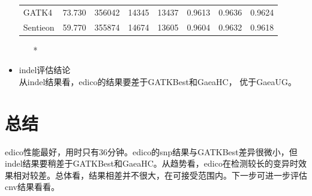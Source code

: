 \documentclass[UTF8,10pt,a4paper]{ctexart}
\begin{document}
\begin{itemize}
\begin{table}[htp]
{\begin{center}
\begin{tabular}{p{1.5cm}|p{1.5cm}|p{1.5cm}|p{1.5cm}|p{1.5cm}|p{1.5cm}|p{1.5cm}|p{1.7cm}}
GATK4 & 73.730 & 356042 & 14345 & 13437 & 0.9613 & 0.9636  & 0.9624\\
Sentieon &  59.770 & 355874 & 14674 & 13605 & 0.9604 & 0.9632  & 0.9618\\
\hline
\end{tabular}
\end{center}
\label{default}
}
\begin{itemize}
\item[*] {}
\end{itemize}
\end{table}
\item indel评估结论 \\
	从indel结果看，edico的结果要差于GATKBest和GaeaHC， 优于GaeaUG。
\end{itemize}


\section{总结}
edico性能最好，用时只有36分钟。edico的snp结果与GATKBest差异很微小，但indel结果要稍差于GATKBest和GaeaHC。从趋势看，edico在检测较长的变异时效果相对较差。总体看，结果相差并不很大，在可接受范围内。下一步可进一步评估cnv结果看看。


% 

\begin{figure}[htbp]
\begin{center}
\label{variantType}
\end{center}
\end{figure}
\end{document}

